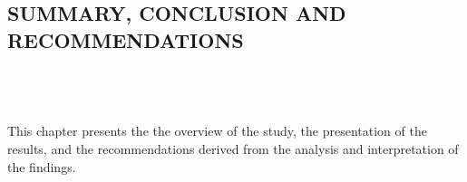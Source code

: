 \begin{doublespace}
	\singlespacing
	\begin{center}
		\section{\textbf{SUMMARY, CONCLUSION AND RECOMMENDATIONS}}
	\end{center}
	\leavevmode\\
	\leavevmode\\
	\leavevmode\\

	\doublespacing
	\justifying
	This chapter presents the the overview of the study, the presentation of the
	results, and the recommendations derived from the analysis and
	interpretation of the findings.

	
	
	

\end{doublespace}
